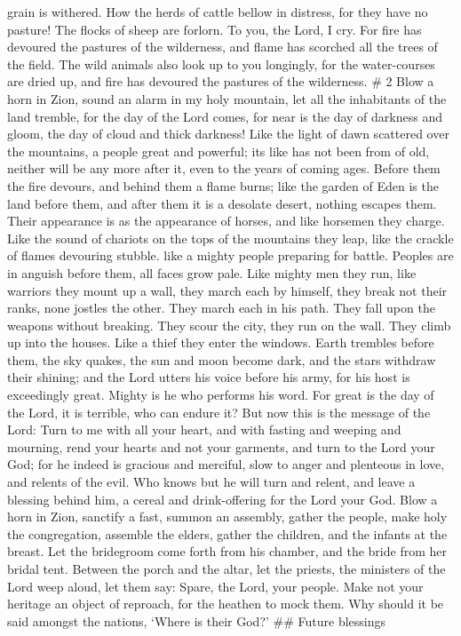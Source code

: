 grain is withered.  How the herds of cattle bellow in
distress, for they have no pasture! The flocks of sheep are forlorn.
 To you, the Lord, I cry. For fire has devoured the
pastures of the wilderness, and flame has scorched all the trees of the
field.  The wild animals also look up to you longingly, for
the water-courses are dried up, and fire has devoured the pastures of
the wilderness. \# 2  Blow a horn in Zion, sound an alarm in
my holy mountain, let all the inhabitants of the land tremble, for the
day of the Lord comes, for near is  the day of darkness and
gloom, the day of cloud and thick darkness! Like the light of dawn
scattered over the mountains, a people great and powerful; its like has
not been from of old, neither will be any more after it, even to the
years of coming ages.  Before them the fire devours, and
behind them a flame burns; like the garden of Eden is the land before
them, and after them it is a desolate desert, nothing escapes them.
 Their appearance is as the appearance of horses, and like
horsemen they charge.  Like the sound of chariots on the
tops of the mountains they leap, like the crackle of flames devouring
stubble. like a mighty people preparing for battle.  Peoples
are in anguish before them, all faces grow pale.  Like
mighty men they run, like warriors they mount up a wall, they march each
by himself, they break not their ranks,  none jostles the
other. They march each in his path. They fall upon the weapons without
breaking.  They scour the city, they run on the wall. They
climb up into the houses. Like a thief they enter the windows.
 Earth trembles before them, the sky quakes, the sun and
moon become dark, and the stars withdraw their shining; 
and the Lord utters his voice before his army, for his host is
exceedingly great. Mighty is he who performs his word. For great is the
day of the Lord, it is terrible, who can endure it?  But
now this is the message of the Lord: Turn to me with all your heart, and
with fasting and weeping and mourning,  rend your hearts
and not your garments, and turn to the Lord your God; for he indeed is
gracious and merciful, slow to anger and plenteous in love, and relents
of the evil.  Who knows but he will turn and relent, and
leave a blessing behind him, a cereal and drink-offering for the Lord
your God.  Blow a horn in Zion, sanctify a fast, summon an
assembly,  gather the people, make holy the congregation,
assemble the elders, gather the children, and the infants at the breast.
Let the bridegroom come forth from his chamber, and the bride from her
bridal tent.  Between the porch and the altar, let the
priests, the ministers of the Lord weep aloud, let them say: Spare, the
Lord, your people. Make not your heritage an object of reproach, for the
heathen to mock them. Why should it be said amongst the nations, `Where
is their God?' \#\# Future blessings

